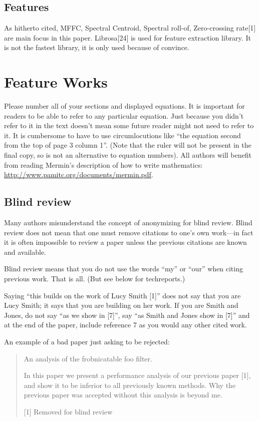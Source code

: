 \documentclass[10pt,twocolumn,letterpaper]{article}
\begin{document}
\subsection{Features}
As hitherto cited, MFFC, Spectral Centroid, Spectral roll-of, Zero-crossing rate[1] are main focus in this paper. Librosa[24] is used for feature extraction library. It is not the fastest library, it is only used because of convince. 

\section{Feature Works}

Please number all of your sections and displayed equations.  It is
important for readers to be able to refer to any particular equation.  Just
because you didn't refer to it in the text doesn't mean some future reader
might not need to refer to it.  It is cumbersome to have to use
circumlocutions like ``the equation second from the top of page 3 column
1''.  (Note that the ruler will not be present in the final copy, so is not
an alternative to equation numbers).  All authors will benefit from reading
Mermin's description of how to write mathematics:
\url{http://www.pamitc.org/documents/mermin.pdf}.


\subsection{Blind review}

Many authors misunderstand the concept of anonymizing for blind
review.  Blind review does not mean that one must remove
citations to one's own work---in fact it is often impossible to
review a paper unless the previous citations are known and
available.

Blind review means that you do not use the words ``my'' or ``our''
when citing previous work.  That is all.  (But see below for
techreports.)

Saying ``this builds on the work of Lucy Smith [1]'' does not say
that you are Lucy Smith; it says that you are building on her
work.  If you are Smith and Jones, do not say ``as we show in
[7]'', say ``as Smith and Jones show in [7]'' and at the end of the
paper, include reference 7 as you would any other cited work.

An example of a bad paper just asking to be rejected:
\begin{quote}
\begin{center}
    An analysis of the frobnicatable foo filter.
\end{center}

   In this paper we present a performance analysis of our
   previous paper [1], and show it to be inferior to all
   previously known methods.  Why the previous paper was
   accepted without this analysis is beyond me.

   [1] Removed for blind review
\end{quote}
\end{document}
